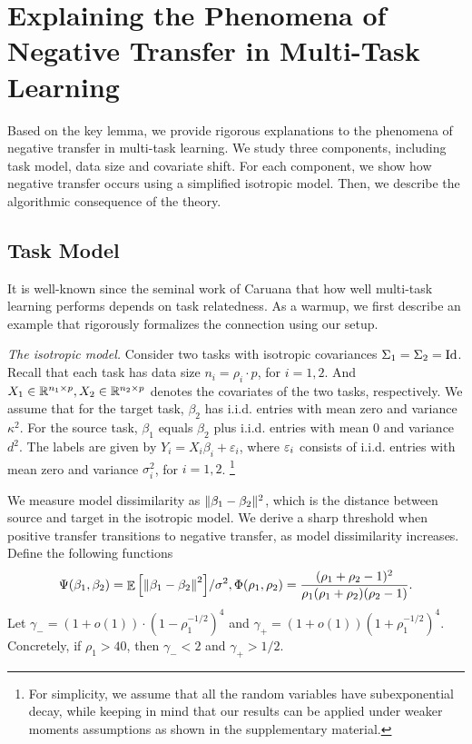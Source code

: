 \section{Explaining the Phenomena of Negative Transfer in Multi-Task Learning}\label{sec_insight}

Based on the key lemma, we provide rigorous explanations to the phenomena of negative transfer in multi-task learning.
We study three components, including task model, data size and covariate shift.
For each component, we show how negative transfer occurs using a simplified isotropic model.
Then, we describe the algorithmic consequence of the theory.

\subsection{Task Model}\label{sec_similarity}

It is well-known since the seminal work of Caruana \cite{C97} that how well multi-task learning performs depends on task relatedness.
As a warmup, we first describe an example that rigorously formalizes the connection using our setup.

\textit{The isotropic model.}
	Consider two tasks with isotropic covariances $\Sigma_1 = \Sigma_2 = \operatorname{Id}$.
	Recall that each task has data size $n_i = \rho_i \cdot p$, for $i = 1, 2$.
	And $X_1\in\mathbb{R}^{n_1\times p}, X_2\in\mathbb{R}^{n_2\times p}$ denotes the covariates of the two tasks, respectively.
	We assume that for the target task, $\beta_2$ has i.i.d. entries with mean zero and variance $\kappa^2$.
	For the source task, $\beta_1 $ equals $\beta_2$ plus i.i.d. entries with mean $0$ and variance $d^2$.
	The labels are given by $Y_i = X_i\beta_i + \varepsilon_i$, where ${\varepsilon}_i$ consists of i.i.d. entries with mean zero and variance $\sigma_i^2$, for $i=1,2$.
	\footnote{For simplicity, we assume that all the random variables have subexponential decay, while keeping in mind that our results can be applied under weaker moments assumptions as shown in the supplementary material.}

We measure model dissimilarity as $\|\beta_1 - \beta_2\|^2$, which is the distance between source and target in the isotropic model.
We derive a sharp threshold when positive transfer transitions to negative transfer, as model dissimilarity increases.
Define the following functions
\begin{align*}
	\Psi(\beta_1, \beta_2) = {\mathop{\mathbb{E}}\left[ \left\| \beta_1 - \beta_2 \right\|^2 \right]} / {\sigma^2},  \Phi(\rho_1, \rho_2) = \frac{(\rho_1 + \rho_2 - 1)^2}{\rho_1 (\rho_1 + \rho_2) (\rho_2 - 1)}.
\end{align*}
Let $\gamma_{-} = (1+o(1))\cdot(1 - \rho_1^{-1/2})^4$ and $\gamma_{+} = (1+o(1))(1 + \rho_1^{-1/2})^4$.
Concretely, if $\rho_1 > 40$, then $\gamma_{-} < 2$ and $\gamma_{+} > 1/2$.

